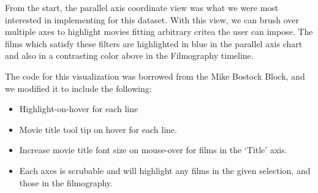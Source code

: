 \documentclass[12pt]{article}
\begin{document}
From the start, the parallel axis coordinate view was what we were most interested in implementing for this dataset. With this view, we can brush over multiple axes to highlight movies fitting arbitrary critea the user can impose.  The films which satisfy these filters are highlighted in blue in the parallel axis chart and also in a contrasting color above in the Filmography timeline.

The code for this visualization was borrowed from the Mike Bostock Block, and we modified it to include the following:

\begin{itemize}
	\item Highlight-on-hover  for each line
	\item Movie title tool tip on hover for each line.
	\item Increase movie title font size on mouse-over for films  in the `Title' axis.
	\item Each axes is scrubable and will highlight any films in the given selection, and those in the filmography.
\end{itemize}
\end{document}
